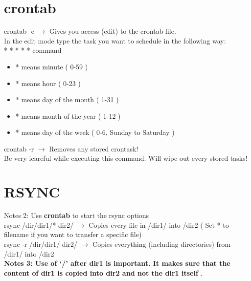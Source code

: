 \documentclass[twoside,a4paper]{article}
\newcommand{\tcb}{\color{blue}}
\newcommand{\tcc}{\color{cyan}}
\newcommand{\tcr}{\color{red}}
\newcommand{\tcg}{\color{gray}}
\newcommand{\tco}{\color{orange}}
\newcommand{\tcp}{\color{purple}}
\newcommand{\tck}{\color{black}}
\newcommand{\ra }{$\rightarrow$ }
\newcommand{\hs}{\hspace}
\begin{document}
\begin{multicols}{2}
\tcc \section{crontab}
	\hs{-0.5 cm}\tcr crontab \tcb  -e \tck 
	\ra Gives you access (edit) to the \tcr  crontab 
	\tck  file.\\
	In the edit mode type the task you want to schedule in the following 
	way:\\
	\tcr  \tcb  * \tcr  * \color{green} * 
	\color{magenta} * \tcg  * \tck  command 
	\tck 
	\begin{itemize}
		\item \tcb  * \tck  means minute ( 0-59 )
		\item \tcr   * \tck  means hour ( 0-23 )
		\item \color{green} * \tck  means day of the month
		( 1-31 )
		\item \color{magenta} * \tck  means month of the 
		year ( 1-12 )
		\item \tcg  * \tck  means day of the week
		( 0-6, Sunday to Saturday )
	\end{itemize}

	\hs{-0.7 cm} \tcr crontab \tcb  -r \tck 
	\ra Removes any stored crontask! \tcg \\
	Be very icareful while executing this command. Will wipe out every 
	stored tasks!

	\tcc \section{RSYNC}
	\hs{-0.5cm}\tcg  Notes 2: Use \textbf{crontab} to start 
	the rsync options\\
	\hs{-0.5 cm}\tcr rsync \tcp /dir/dir1/* 
	\tco dir2/ \tck  \ra Copies every file in
	\tcp /dir1/ into \tco  /dir2 \tck ( Set *
	to filename if you want to transfer a specific file)\\
	\tcr rsync -r \tcp /dir/dir1/ \tco dir2/ 
	\tck  \ra Copies everything (including directories)
	from \tcp  /dir1/ \tck  into \tco /dir2
	\tck \\
	\tcg \textbf{Notes 3: Use of \textbf{`/'} after \textbf{dir1} is 
	important. It makes sure that the content of \textbf{dir1} is copied 
	into \textbf{dir2} and not the \textbf{dir1} itself }.\\


\end{multicols}
\end{document}
